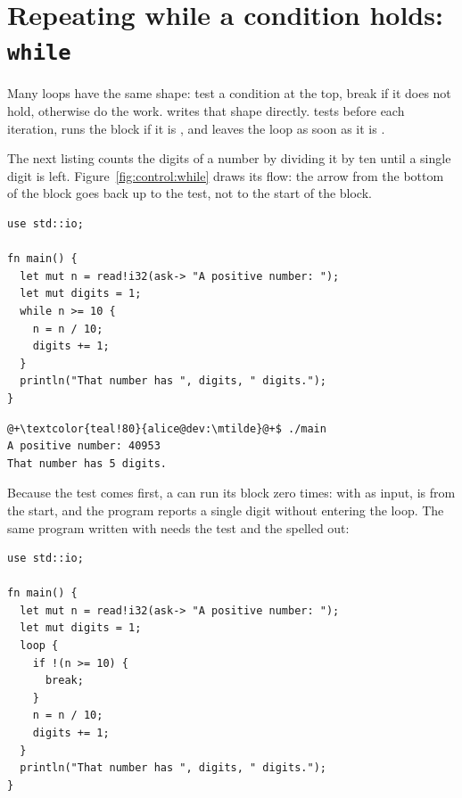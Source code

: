 \vfill\pagebreak
\section{Repeating while a condition holds: \texttt{while}}
\label{sec:control:while}

Many loops have the same shape: test a condition at the top, break if it does
not hold, otherwise do the work.  writes that shape directly.
 tests  before each iteration,
runs the block if it is , and leaves the loop as soon as it is
.

The next listing counts the digits of a number by dividing it by ten until a
single digit is left. Figure~\ref{fig:control:while} draws its flow: the arrow
from the bottom of the block goes back up to the test, not to the start of the
block.

\begin{lstlisting}[style=coloredverbatim, caption=Counting digits with a \token{while} loop, label=lst:control:while]
use std::io;

fn main() {
  let mut n = read!i32(ask-> "A positive number: ");
  let mut digits = 1;
  while n >= 10 {
    n = n / 10;
    digits += 1;
  }
  println("That number has ", digits, " digits.");
}
\end{lstlisting}
\vspace{-10pt}%
\begin{lstlisting}[style=bashVerb, escapechar=@+]
@+\textcolor{teal!80}{alice@dev:\mtilde}@+$ ./main
A positive number: 40953
That number has 5 digits.
\end{lstlisting}



Because the test comes first, a  can run its block zero times: with
 as input,  is  from the start, and the
program reports a single digit without entering the loop. The same program written with
 needs the test and the  spelled out:

\begin{lstlisting}[style=coloredverbatim, caption=The same loop without \token{while}]
use std::io;

fn main() {
  let mut n = read!i32(ask-> "A positive number: ");
  let mut digits = 1;
  loop {
    if !(n >= 10) {
      break;
    }
    n = n / 10;
    digits += 1;
  }
  println("That number has ", digits, " digits.");
}
\end{lstlisting}


